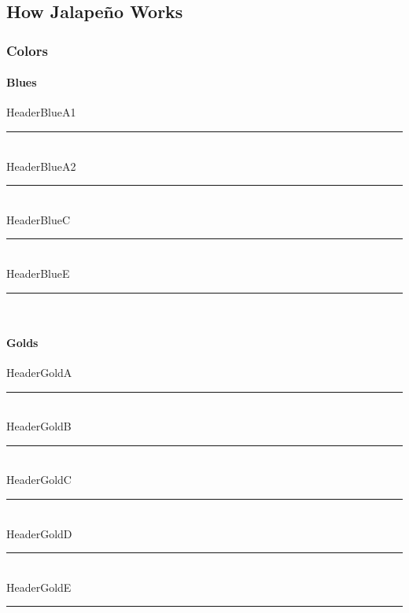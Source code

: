 \documentclass[class=book , crop=false]{standalone}
\title{}  %
\begin{document}

\ifstandalone
\frontmatter %
\maketitle %
\tableofcontents %
\clearpage
\mainmatter %
\fi

\subsection[How Jalape\~no Works]{\large How \LARGE Jalape\~no \large Works}
\subsubsection{Colors}
%
\paragraph[Blues]{Blues\texorpdfstring{\\}{}}
\textcolor{HeaderBlueA1}{HeaderBlueA1}
\noindent\textcolor{HeaderBlueA1}{\rule{.5\textwidth}{.5mm}}\\
\textcolor{HeaderBlueA2}{HeaderBlueA2}
\noindent\textcolor{HeaderBlueA2}{\rule{.5\textwidth}{.5mm}}\\
\textcolor{HeaderBlueC}{HeaderBlueC}
\noindent\textcolor{HeaderBlueC}{\rule{.5\textwidth}{.5mm}}\\
\textcolor{HeaderBlueE}{HeaderBlueE}
\noindent\textcolor{HeaderBlueE}{\rule{.5\textwidth}{.5mm}}\\
%
\paragraph[Golds]{Golds\texorpdfstring{\\}{}}
\textcolor{HeaderGoldA}{HeaderGoldA}
\noindent\textcolor{HeaderGoldA}{\rule{.5\textwidth}{.5mm}}\\
\textcolor{HeaderGoldB}{HeaderGoldB}
\noindent\textcolor{HeaderGoldB}{\rule{.5\textwidth}{.5mm}}\\
\textcolor{HeaderGoldC}{HeaderGoldC}
\noindent\textcolor{HeaderGoldC}{\rule{.5\textwidth}{.5mm}}\\
\textcolor{HeaderGoldD}{HeaderGoldD}
\noindent\textcolor{HeaderGoldD}{\rule{.5\textwidth}{.5mm}}\\
\textcolor{HeaderGoldE}{HeaderGoldE}
\noindent\textcolor{HeaderGoldE}{\rule{.5\textwidth}{.5mm}}\\
%
\end{document}
